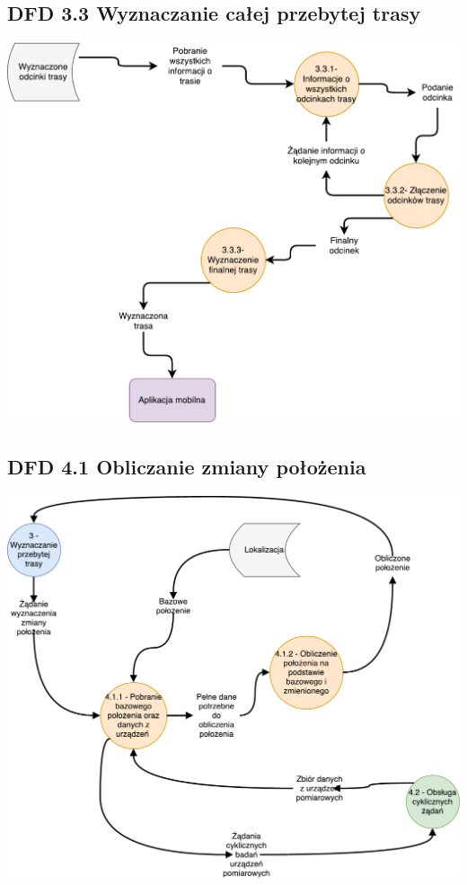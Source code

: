 \documentclass[11pt]{article}
\begin{document}
	\subsection{DFD 3.3 Wyznaczanie całej przebytej trasy}
	\begin{center}
		\includegraphics[scale=0.6]{DFD33.pdf}
	\end{center}
	\newpage
	\subsection{DFD 4.1 Obliczanie zmiany położenia}
	\begin{center}
		\includegraphics[scale=0.6]{DFD41.pdf}
	\end{center}
\end{document}
